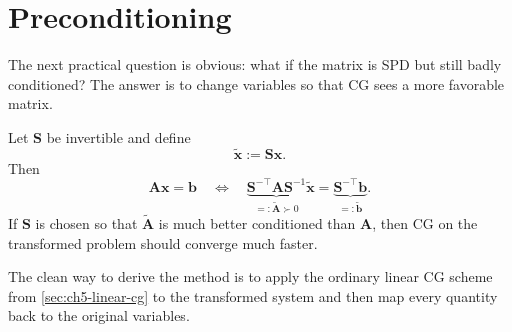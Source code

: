 \section{Preconditioning}
\label{sec:ch5-preconditioning}
The next practical question is obvious: what if the matrix is SPD but still
badly conditioned? The answer is to change variables so that CG sees a more
favorable matrix.

Let $\mathbf{S}$ be invertible and define
\[
  \tilde{\mathbf{x}}:=\mathbf{S}\mathbf{x}.
\]
Then
\[
  \mathbf{A}\mathbf{x}=\mathbf{b}
  \quad \Longleftrightarrow \quad
\underbrace{\mathbf{S}^{-\top}\mathbf{A}\mathbf{S}^{-1}}_{=:\tilde{\mathbf{A}} \succ 0}
  \tilde{\mathbf{x}}
  =
  \underbrace{\mathbf{S}^{-\top}\mathbf{b}}_{=:\tilde{\mathbf{b}}}.
\]
If $\mathbf{S}$ is chosen so that $\tilde{\mathbf{A}}$ is much better
conditioned than $\mathbf{A}$, then CG on the transformed problem should
converge much faster.

The clean way to derive the method is to apply the ordinary linear CG scheme
from \cref{sec:ch5-linear-cg} to the transformed system and then map every
quantity back to the original variables.

